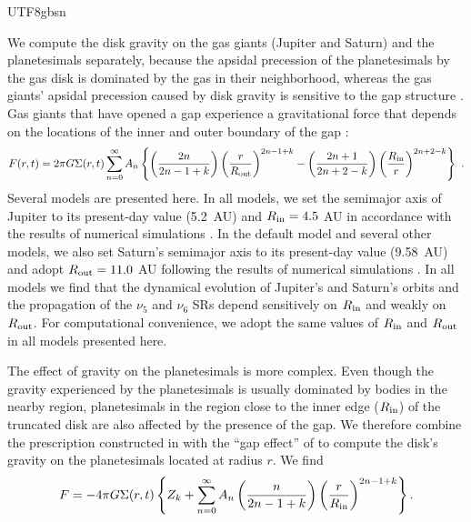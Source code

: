 \documentclass[tighten]{aastex6}
\begin{document}
\begin{CJK*}{UTF8}{gbsn}


We compute the disk gravity on the gas giants (Jupiter and Saturn) and the planetesimals separately, because the apsidal precession of the planetesimals by the gas disk is dominated by the gas in their neighborhood, whereas the gas giants' apsidal precession caused by disk gravity is sensitive to the gap structure \citep{nagasawa2005}. Gas giants that have opened a gap experience a 
gravitational force that depends on the locations of the inner and 
outer boundary of the gap \citep{ward1981, nagasawaida2000}: 
%
\begin{equation}
F(r,t) = 2\pi G \Sigma(r,t) \sum_{n=0}^{\infty} A_{n} 
		\left\{ 
		\left( \frac{2n}         {2n-1+k}       \right)
		\left( \frac{r}          {R_{\rm out}}  \right)^{2n-1+k}  	 
	  -\left( \frac{2n+1}       {2n+2-k}       \right)
  	    \left( \frac{R_{\rm in}} {r}            \right)^{2n+2-k} 
	 	\right\} \  .
\end{equation}
Several models are presented here.  In all models, we set the semimajor axis 
of Jupiter to its present-day value (5.2~AU) and  $R_{\rm in} = 4.5~$AU 
in accordance with the results of numerical simulations \citep{bryden1999}.
In the default model and several other models, we also set Saturn's semimajor axis
to its present-day value (9.58~AU) and adopt $R_{\rm out} = 11.0~$AU following
the results of numerical simulations \citep{bryden2000}.  In all models
we find that the dynamical evolution of Jupiter's and Saturn's orbits and the 
propagation of the $\nu_5$ and $\nu_6$ SRs depend sensitively on $R_{\rm in}$ and weakly on $R_{\rm out}$.  For 
computational convenience, we adopt the same values of $R_{\rm in}$ and 
$R_{\rm out}$ in all models presented here.

The effect of gravity on the planetesimals is more complex. Even though 
the gravity experienced by the planetesimals is usually dominated by 
bodies in the nearby region, planetesimals in the region close to the inner edge 
($R_{\rm in}$) of the truncated disk are also affected by the presence 
of the gap. We therefore combine the prescription constructed in 
\cite{nagasawa2005} with the ``gap effect'' of \cite{ward1981} to 
compute the disk's gravity on the planetesimals located at radius $r$.  
We find
%
\begin{equation}
F = - 4\pi G \Sigma(r,t)
	\left\{
	Z_k + \sum_{n=0}^{\infty} A_{n} 
	\left(\frac{n}{2n-1+k}\right)
	\left(\frac{r}{R_{\rm in}}\right)^{2n-1+k}
	\right\}.
\label {eq:f_pd}
\end{equation}
%


\end{CJK*}
\end{document}
